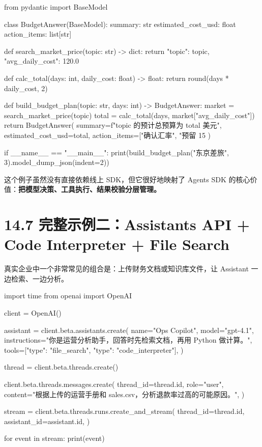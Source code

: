 \begin{codeblock}
from pydantic import BaseModel

class BudgetAnswer(BaseModel):
    summary: str
    estimated_cost_usd: float
    action_items: list[str]

def search_market_price(topic: str) -> dict:
    return {"topic": topic, "avg_daily_cost": 120.0}

def calc_total(days: int, daily_cost: float) -> float:
    return round(days * daily_cost, 2)

def build_budget_plan(topic: str, days: int) -> BudgetAnswer:
    market = search_market_price(topic)
    total = calc_total(days, market["avg_daily_cost"])
    return BudgetAnswer(
        summary=f"{topic} 的预计总预算为 {total} 美元",
        estimated_cost_usd=total,
        action_items=["确认汇率", "预留 15%
    )

if __name__ == "__main__":
    print(build_budget_plan("东京差旅", 3).model_dump_json(indent=2))
\end{codeblock}

这个例子虽然没有直接依赖线上 SDK，但它很好地映射了 Agents SDK 的核心价值：\textbf{把模型决策、工具执行、结果校验分层管理。}


\section{14.7 完整示例二：Assistants API + Code Interpreter + File Search}

真实企业中一个非常常见的组合是：上传财务文档或知识库文件，让 Assistant 一边检索、一边分析。


\begin{codeblock}
import time
from openai import OpenAI

client = OpenAI()

assistant = client.beta.assistants.create(
    name="Ops Copilot",
    model="gpt-4.1",
    instructions="你是运营分析助手，回答时先检索文档，再用 Python 做计算。",
    tools=[{"type": "file_search"}, {"type": "code_interpreter"}],
)

thread = client.beta.threads.create()

client.beta.threads.messages.create(
    thread_id=thread.id,
    role="user",
    content="根据上传的运营手册和 sales.csv，分析退款率过高的可能原因。",
)

stream = client.beta.threads.runs.create_and_stream(
    thread_id=thread.id,
    assistant_id=assistant.id,
)

for event in stream:
    print(event)
\end{codeblock}

